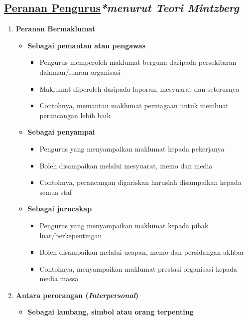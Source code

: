 \documentclass{book}
\begin{document}
\begin{multicols*}{2}
    \subsection*{\underline{Peranan Pengurus}\hfill\footnotesize\emph{*menurut Teori Mintzberg}}
    \begin{enumerate}
      \item \textbf{Peranan Bermaklumat} 
      \begin{itemize}[leftmargin=*]
        \item \textbf{Sebagai pemantau atau pengawas} 
          \begin{itemize}[leftmargin=*]
            \item Pengurus memperoleh maklumat berguna daripada persekitaran dalaman/luaran organisasi
            \item Maklumat diperoleh daripada laporan, mesyuarat dan seterusnya
            \item Contohnya, memantau maklumat perniagaan untuk membuat perancangan lebih baik
          \end{itemize} 
        \item \textbf{Sebagai penyampai}
          \begin{itemize}[leftmargin=*]
            \item Pengurus yang menyampaikan maklumat kepada pekerjanya
            \item Boleh disampaikan melalui mesyuarat, memo dan media
            \item Contohnya, perancangan digariskan haruslah disampaikan kepada semua staf
          \end{itemize}
        \item \textbf{Sebagai jurucakap}
          \begin{itemize}[leftmargin=*]
            \item Pengurus yang menyampaikan maklumat kepada pihak luar/berkepentingan 
            \item Boleh disampaikan melalui ucapan, memo dan persidangan akhbar
            \item Contohnya, menyampaikan maklumat prestasi organisasi kepada media massa
          \end{itemize}
      \end{itemize}
      \item \textbf{Antara perorangan (\textit{Interpersonal})} 
      \begin{itemize}[leftmargin=*]
        \item \textbf{Sebagai lambang, simbol atau orang terpenting}

\end{itemize}
\end{enumerate}
\end{multicols*}
\end{document}
